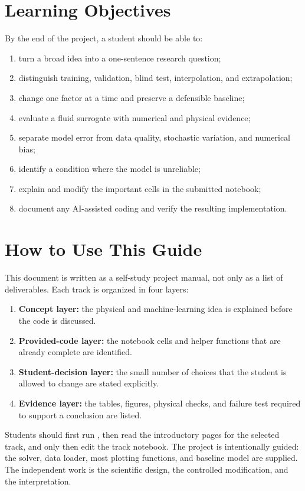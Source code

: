 \documentclass[11pt]{article}
\newcommand{\file}[1]{\path{#1}}
\begin{document}
\section{Learning Objectives}
By the end of the project, a student should be able to:
\begin{enumerate}
\item turn a broad idea into a one-sentence research question;
\item distinguish training, validation, blind test, interpolation, and extrapolation;
\item change one factor at a time and preserve a defensible baseline;
\item evaluate a fluid surrogate with numerical and physical evidence;
\item separate model error from data quality, stochastic variation, and numerical bias;
\item identify a condition where the model is unreliable;
\item explain and modify the important cells in the submitted notebook;
\item document any AI-assisted coding and verify the resulting implementation.
\end{enumerate}

\section{How to Use This Guide}
This document is written as a self-study project manual, not only as a list of deliverables. Each track is organized in four layers:
\begin{enumerate}
\item \textbf{Concept layer:} the physical and machine-learning idea is explained before the code is discussed.
\item \textbf{Provided-code layer:} the notebook cells and helper functions that are already complete are identified.
\item \textbf{Student-decision layer:} the small number of choices that the student is allowed to change are stated explicitly.
\item \textbf{Evidence layer:} the tables, figures, physical checks, and failure test required to support a conclusion are listed.
\end{enumerate}
Students should first run \file{P0_Project_Setup.ipynb}, then read the introductory pages for the selected track, and only then edit the track notebook. The project is intentionally guided: the solver, data loader, most plotting functions, and baseline model are supplied. The independent work is the scientific design, the controlled modification, and the interpretation.
\end{document}
